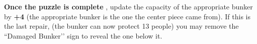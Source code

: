 \documentclass[green]{GL2020}
\begin{document}
\textbf{Once the puzzle is complete} , update the capacity of the appropriate bunker by \textbf{+4} (the appropriate bunker is the one the center piece came from).  If this is the last repair, (the bunker can now protect 13 people) you may remove the ``Damaged Bunker’’ sign to reveal the one below it.
\end{document}
